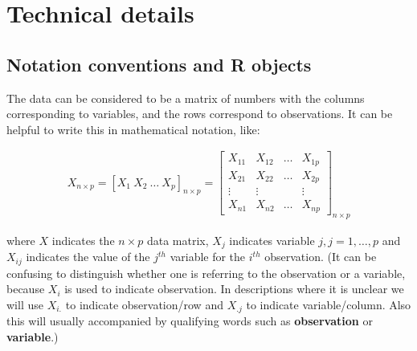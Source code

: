 \documentclass[
  letterpaper,
]{krantz}
\newenvironment{Shaded}{\begin{snugshade}}{\end{snugshade}}
\newcommand{\AttributeTok}[1]{\textcolor[rgb]{0.40,0.45,0.13}{#1}}
\newcommand{\ConstantTok}[1]{\textcolor[rgb]{0.56,0.35,0.01}{#1}}
\newcommand{\DecValTok}[1]{\textcolor[rgb]{0.68,0.00,0.00}{#1}}
\newcommand{\FunctionTok}[1]{\textcolor[rgb]{0.28,0.35,0.67}{#1}}
\newcommand{\NormalTok}[1]{\textcolor[rgb]{0.00,0.23,0.31}{#1}}
\newcommand{\SpecialCharTok}[1]{\textcolor[rgb]{0.37,0.37,0.37}{#1}}
\begin{document}
\begin{Shaded}
\end{Shaded}

\chapter{Technical details}\label{sec-notation}

\section{Notation conventions and R
objects}\label{notation-conventions-and-r-objects}

The data can be considered to be a matrix of numbers with the columns
corresponding to variables, and the rows correspond to observations. It
can be helpful to write this in mathematical notation, like:

\begin{eqnarray*}
X_{n\times p} =
[X_1~X_2~\dots~X_p]_{n\times p} = \left[ \begin{array}{cccc}
X_{11} & X_{12} & \dots & X_{1p} \\
X_{21} & X_{22} & \dots & X_{2p}\\
\vdots & \vdots &  & \vdots \\
X_{n1} & X_{n2} & \dots & X_{np} \end{array} \right]_{n\times p}
\end{eqnarray*}

where \(X\) indicates the \(n\times p\) data matrix, \(X_j\) indicates
variable \(j, j=1, \dots, p\) and \(X_{ij}\) indicates the value of the
\(j^{th}\) variable for the \(i^{th}\) observation. (It can be confusing
to distinguish whether one is referring to the observation or a
variable, because \(X_i\) is used to indicate observation. In
descriptions where it is unclear we will use \(X_{i.}\) to indicate
observation/row and \(X_{.j}\) to indicate variable/column. Also this
will usually accompanied by qualifying words such as
\textbf{observation} or \textbf{variable}.)
\end{document}

